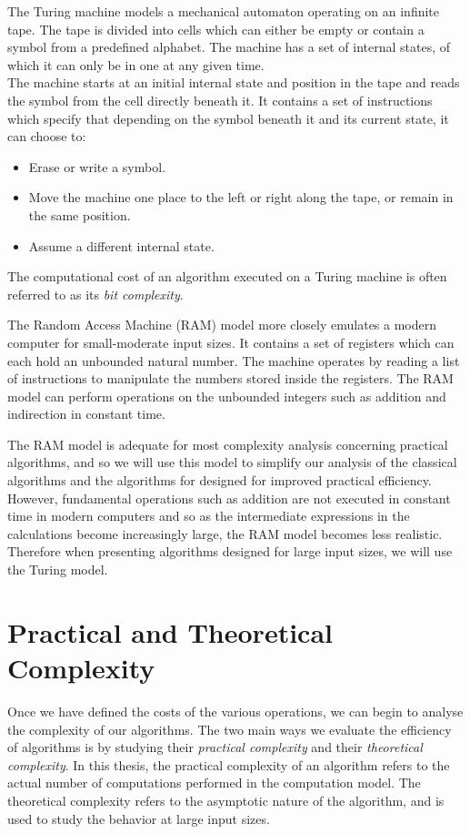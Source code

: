 The Turing machine models a mechanical automaton operating on an infinite tape. The tape is divided into cells which can either be empty or contain a symbol from a predefined alphabet. The machine has a set of internal states, of which it can only be in one at any given time.\\
The machine starts at an initial internal state and position in the tape and reads the symbol from the cell directly beneath it. It contains a set of instructions which specify that depending on the symbol beneath it and its current state, it can choose to:
\begin{itemize}
    \item Erase or write a symbol.
    \item Move the machine one place to the left or right along the tape, or remain in the same position.
    \item Assume a different internal state.
\end{itemize}
The computational cost of an algorithm executed on a Turing machine is often referred to as its \textit{bit complexity}. 

The Random Access Machine (RAM) model more closely emulates a modern computer for small-moderate input sizes. It contains a set of registers which can each hold an unbounded natural number. The machine operates by reading a list of instructions to manipulate the numbers stored inside the registers. The RAM model can perform operations on the unbounded integers such as addition and indirection in constant time.

The RAM model is adequate for most complexity analysis concerning practical algorithms, and so we will use this model to simplify our analysis of the classical algorithms and the algorithms for designed for improved practical efficiency. However, fundamental operations such as addition are not executed in constant time in modern computers and so as the intermediate expressions in the calculations become increasingly large, the RAM model becomes less realistic. Therefore when presenting algorithms designed for large input sizes, we will use the Turing model.

\section{Practical and Theoretical Complexity}%
\label{sec:Practical and Theoretical Complexity}

Once we have defined the costs of the various operations, we can begin to analyse the complexity of our algorithms. The two main ways we evaluate the efficiency of algorithms is by studying their \emph{practical complexity} and their \emph{theoretical complexity}. In this thesis, the practical complexity of an algorithm refers to the actual number of computations performed in the computation model. The theoretical complexity refers to the asymptotic nature of the algorithm, and is used to study the behavior at large input sizes.

